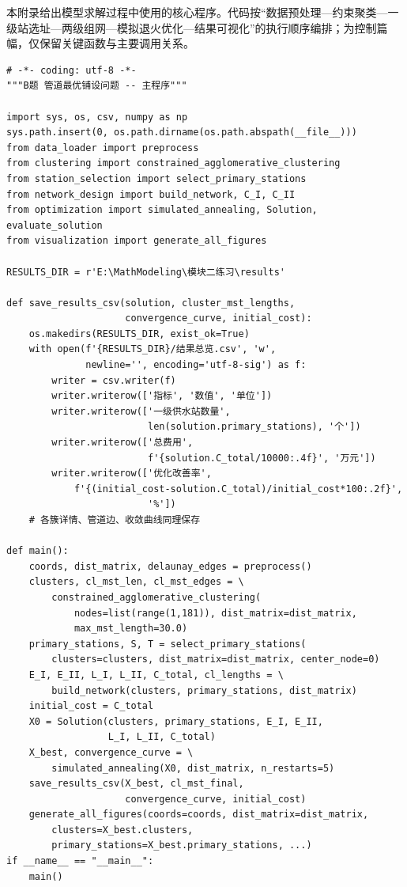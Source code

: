 \documentclass[12pt,a4paper]{ctexart}
\theoremstyle{definition}
\theoremstyle{plain}
\theoremstyle{remark}
\begin{document}
\noindent{}本附录给出模型求解过程中使用的核心程序。代码按“数据预处理—约束聚类—一级站选址—两级组网—模拟退火优化—结果可视化”的执行顺序编排；为控制篇幅，仅保留关键函数与主要调用关系。\par

\begin{lstlisting}[caption={\texttt{main.py}：主程序入口与结果输出}]
# -*- coding: utf-8 -*-
"""B题 管道最优铺设问题 -- 主程序"""

import sys, os, csv, numpy as np
sys.path.insert(0, os.path.dirname(os.path.abspath(__file__)))
from data_loader import preprocess
from clustering import constrained_agglomerative_clustering
from station_selection import select_primary_stations
from network_design import build_network, C_I, C_II
from optimization import simulated_annealing, Solution, evaluate_solution
from visualization import generate_all_figures

RESULTS_DIR = r'E:\MathModeling\模块二练习\results'

def save_results_csv(solution, cluster_mst_lengths,
                     convergence_curve, initial_cost):
    os.makedirs(RESULTS_DIR, exist_ok=True)
    with open(f'{RESULTS_DIR}/结果总览.csv', 'w',
              newline='', encoding='utf-8-sig') as f:
        writer = csv.writer(f)
        writer.writerow(['指标', '数值', '单位'])
        writer.writerow(['一级供水站数量',
                         len(solution.primary_stations), '个'])
        writer.writerow(['总费用',
                         f'{solution.C_total/10000:.4f}', '万元'])
        writer.writerow(['优化改善率',
            f'{(initial_cost-solution.C_total)/initial_cost*100:.2f}',
                         '%'])
    # 各簇详情、管道边、收敛曲线同理保存

def main():
    coords, dist_matrix, delaunay_edges = preprocess()
    clusters, cl_mst_len, cl_mst_edges = \
        constrained_agglomerative_clustering(
            nodes=list(range(1,181)), dist_matrix=dist_matrix,
            max_mst_length=30.0)
    primary_stations, S, T = select_primary_stations(
        clusters=clusters, dist_matrix=dist_matrix, center_node=0)
    E_I, E_II, L_I, L_II, C_total, cl_lengths = \
        build_network(clusters, primary_stations, dist_matrix)
    initial_cost = C_total
    X0 = Solution(clusters, primary_stations, E_I, E_II,
                  L_I, L_II, C_total)
    X_best, convergence_curve = \
        simulated_annealing(X0, dist_matrix, n_restarts=5)
    save_results_csv(X_best, cl_mst_final,
                     convergence_curve, initial_cost)
    generate_all_figures(coords=coords, dist_matrix=dist_matrix,
        clusters=X_best.clusters,
        primary_stations=X_best.primary_stations, ...)
if __name__ == "__main__":
    main()
\end{lstlisting}
\end{document}
